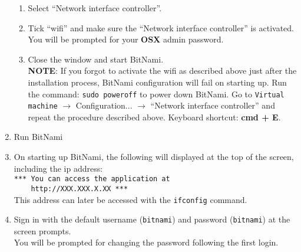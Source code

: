 \begin{enumerate}
\begin{enumerate}
		\item Select ``Network interface controller''.
		\item Tick ``wifi'' and make sure the ``Network interface controller'' is activated. You will be prompted for your \textbf{OSX} admin password.
		\item Close the window and start BitNami.\\
		\textbf{NOTE}: If you forgot to activate the wifi as described above just after the installation process, BitNami configuration will fail on starting up. Run the command: \texttt{sudo poweroff} to power down BitNami.  Go to \texttt{Virtual machine} $\rightarrow$ Configuration... $\rightarrow$ ``Network interface controller'' and repeat the procedure described above. Keyboard shortcut: \textbf{cmd + E}. 
		\end{enumerate}			
	\item Run BitNami
	\item On starting up BitNami, the following will displayed at the top of the screen, including the ip address: \\
		\texttt{*** You can access the application at\\~~~~http://XXX.XXX.X.XX ***} \\
		This address can later be accessed with the \texttt{ifconfig} command.
	\item Sign in with the default username (\texttt{bitnami}) and password (\texttt{bitnami}) at the screen prompts.\\
		You will be prompted for changing the password following the first login.
\end{enumerate}

